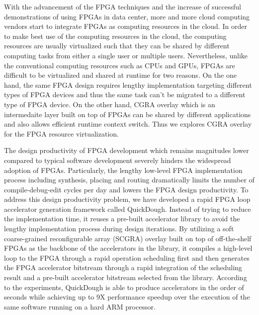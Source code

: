With the advancement of the FPGA techniques and the increase of successful demonstrations 
of using FPGAs in data center, more and more cloud computing vendors start to integrate 
FPGAs as computing resources in the cloud. In order to make best use of the computing resources 
in the cloud, the computing resources are usually virtualized such that they can be shared by different 
computing tasks from either a single user or multiple users. Nevertheless, unlike the 
conventional computing resources such as CPUs and GPUs, FPGAs are difficult to be virtualized 
and shared at runtime for two reasons. On the one hand, the same FPGA design requires lengthy implementation 
targeting different types of FPGA devices and thus the same task can't be migrated to 
a different type of FPGA device. On the other hand, 
CGRA overlay which is an intermedaite layer built on top of FPGAs can be shared by 
different applications and also allows efficient runtime context switch. Thus we explores 
CGRA overlay for the FPGA resource virtualization. 



The design productivity of FPGA development which remains magnitudes lower compared to typical software development severely hinders the widespread adoption of FPGAs. Particularly, the lengthy low-level FPGA implementation process including synthesis, placing and routing dramatically limits the number of compile-debug-edit cycles per day and lowers the FPGA design productivity. To address this design productivity problem, we have developed a rapid FPGA loop accelerator generation framework called QuickDough. Instead of trying to reduce the implementation time, it reuses a pre-built accelerator library to avoid the lengthy implementation process during design iterations. By utilizing a soft coarse-grained reconfigurable array (SCGRA) overlay built on top of off-the-shelf FPGAs as the backbone of the accelerators in the library, it compiles a high-level loop to the FPGA through a rapid operation scheduling first and then generates the FPGA accelerator bitstream through a rapid integration of the scheduling result and a pre-built accelerator bitstream selected from the library. According to the experiments, QuickDough is able to produce accelerators in the order of seconds while achieving up to 9X performance speedup over the execution of the same software running on a hard ARM processor.  
